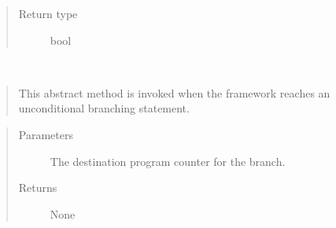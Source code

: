 \documentclass[letterpaper,10pt,english]{sphinxmanual}
\begin{document}
\begin{fulllineitems}
\begin{fulllineitems}
\begin{quote}
\begin{description}
\item[{Return type}] \leavevmode
\sphinxAtStartPar
bool

\end{description}\end{quote}

\end{fulllineitems}


\begin{fulllineitems}
\label{\detokenize{index:State.State.unconditional_branch}}~\begin{quote}

\sphinxAtStartPar
This abstract method is invoked when the framework reaches an unconditional branching statement.
\end{quote}
\begin{quote}\begin{description}
\item[{Parameters}] \leavevmode
\sphinxAtStartPar
{} \textendash{} The destination program counter for the branch.

\item[{Returns}] \leavevmode
\sphinxAtStartPar
None

\end{description}\end{quote}

\end{fulllineitems}


\end{fulllineitems}

\label{\detokenize{index:module-Wrappers}}
\end{document}
